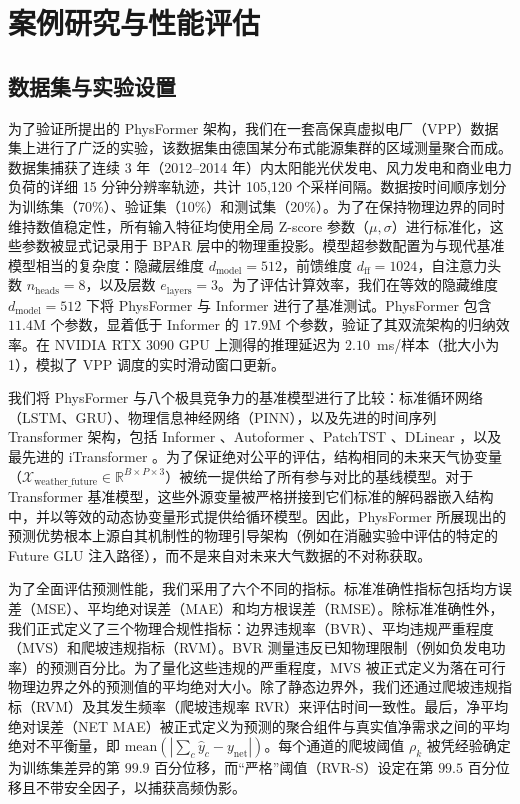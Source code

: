 \section{案例研究与性能评估}
\label{sec:experiments}

\subsection{数据集与实验设置}
\label{subsec:exp_setup}

为了验证所提出的 PhysFormer 架构，我们在一套高保真虚拟电厂（VPP）数据集上进行了广泛的实验，该数据集由德国某分布式能源集群的区域测量聚合而成。数据集捕获了连续 3 年（2012--2014 年）内太阳能光伏发电、风力发电和商业电力负荷的详细 15 分钟分辨率轨迹，共计 105,120 个采样间隔。数据按时间顺序划分为训练集（70\%）、验证集（10\%）和测试集（20\%）。为了在保持物理边界的同时维持数值稳定性，所有输入特征均使用全局 Z-score 参数（$\mu, \sigma$）进行标准化，这些参数被显式记录用于 BPAR 层中的物理重投影。模型超参数配置为与现代基准模型相当的复杂度：隐藏层维度 $d_{\text{model}} = 512$，前馈维度 $d_{\text{ff}} = 1024$，自注意力头数 $n_{\text{heads}} = 8$，以及层数 $e_{\text{layers}} = 3$。为了评估计算效率，我们在等效的隐藏维度 $d_{\text{model}} = 512$ 下将 PhysFormer 与 Informer 进行了基准测试。PhysFormer 包含 $11.4$M 个参数，显着低于 Informer 的 $17.9$M 个参数，验证了其双流架构的归纳效率。在 NVIDIA RTX 3090 GPU 上测得的推理延迟为 $2.10$~ms/样本（批大小为 1），模拟了 VPP 调度的实时滑动窗口更新。

我们将 PhysFormer 与八个极具竞争力的基准模型进行了比较：标准循环网络（LSTM、GRU）、物理信息神经网络（PINN）\cite{Raissi2019}，以及先进的时间序列 Transformer 架构，包括 Informer \cite{Zhou2021informer}、Autoformer \cite{Wu2021autoformer}、PatchTST \cite{Nie2023patchtst}、DLinear \cite{Zeng2023}，以及最先进的 iTransformer \cite{Liu2023itransformer}。为了保证绝对公平的评估，结构相同的未来天气协变量（$\mathcal{X}_{\text{weather\_future}} \in \mathbb{R}^{B \times P \times 3}$）被统一提供给了所有参与对比的基线模型。对于 Transformer 基准模型，这些外源变量被严格拼接到它们标准的解码器嵌入结构中，并以等效的动态协变量形式提供给循环模型。因此，PhysFormer 所展现出的预测优势根本上源自其机制性的物理引导架构（例如在消融实验中评估的特定的 Future GLU 注入路径），而不是来自对未来大气数据的不对称获取。

为了全面评估预测性能，我们采用了六个不同的指标。标准准确性指标包括均方误差（MSE）、平均绝对误差（MAE）和均方根误差（RMSE）。除标准准确性外，我们正式定义了三个物理合规性指标：边界违规率（BVR）、平均违规严重程度（MVS）和爬坡违规指标（RVM）。BVR 测量违反已知物理限制（例如负发电功率）的预测百分比。为了量化这些违规的严重程度，MVS 被正式定义为落在可行物理边界之外的预测值的平均绝对大小。除了静态边界外，我们还通过爬坡违规指标（RVM）及其发生频率（爬坡违规率 RVR）来评估时间一致性。最后，净平均绝对误差（NET MAE）被正式定义为预测的聚合组件与真实值净需求之间的平均绝对不平衡量，即 $\text{mean}(|\sum_c \hat{y}_c - y_{\text{net}}|)$。每个通道的爬坡阈值 $\rho_k$ 被凭经验确定为训练集差异的第 $99.9$ 百分位移，而“严格”阈值（RVR-S）设定在第 $99.5$ 百分位移且不带安全因子，以捕获高频伪影。

